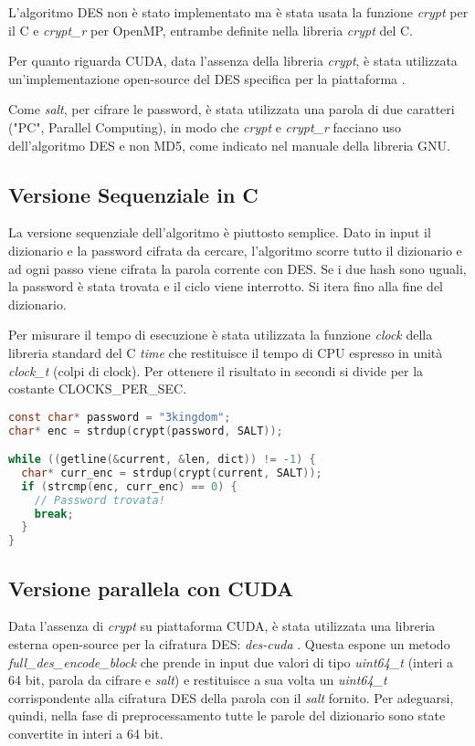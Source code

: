 \documentclass[10pt,twocolumn,letterpaper]{article}
\begin{document}
L'algoritmo DES non è stato implementato ma è stata usata la funzione \textit{crypt} per il C e \textit{crypt\_r} per OpenMP, entrambe definite nella libreria \textit{crypt} del C.

Per quanto riguarda CUDA, data l'assenza della libreria \textit{crypt}, è stata utilizzata un'implementazione open-source del DES specifica per la piattaforma \cite{DES-CUDA}.

Come \textit{salt}, per cifrare le password, è stata utilizzata una parola di due caratteri ("PC", Parallel Computing), in modo che \textit{crypt} e \textit{crypt\_r} facciano uso dell'algoritmo DES e non MD5, come indicato nel manuale della libreria GNU. \cite{SALT}

\subsection{Versione Sequenziale in C}
La versione sequenziale dell'algoritmo è piuttosto semplice. Dato in input il dizionario e la password cifrata da cercare, l'algoritmo scorre tutto il dizionario e ad ogni passo viene cifrata la parola corrente con DES. Se i due hash sono uguali, la password è stata trovata e il ciclo viene interrotto. Si itera fino alla fine del dizionario. 

Per misurare il tempo di esecuzione è stata utilizzata la funzione \textit{clock} della libreria standard del C \textit{time} che restituisce il tempo di CPU espresso in unità \textit{clock\_t} (colpi di clock). Per ottenere il risultato in secondi si divide per la costante CLOCKS\_PER\_SEC.
\newline

\begin{lstlisting}[basicstyle=\footnotesize, language=C, frame=single, caption={Esempio di ricerca sequenziale nel dizionario}, captionpos=b]
const char* password = "3kingdom";
char* enc = strdup(crypt(password, SALT));

while ((getline(&current, &len, dict)) != -1) {
  char* curr_enc = strdup(crypt(current, SALT));
  if (strcmp(enc, curr_enc) == 0) {
    // Password trovata!
    break;
  }
}
\end{lstlisting}

\subsection{Versione parallela con CUDA}
Data l'assenza di \textit{crypt} su piattaforma CUDA, è stata utilizzata una libreria esterna open-source per la cifratura DES: \textit{des-cuda} \cite{DES-CUDA}.
Questa espone un metodo \textit{full\_des\_encode\_block} che prende in input due valori di tipo \textit{uint64\_t} (interi a 64 bit, parola da cifrare e \textit{salt}) e restituisce a sua volta un \textit{uint64\_t} corrispondente alla cifratura DES della parola con il \textit{salt} fornito. Per adeguarsi, quindi, nella fase di preprocessamento tutte le parole del dizionario sono state convertite in interi a 64 bit. 
\end{document}
